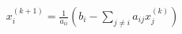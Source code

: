 \documentclass[preview]{standalone}
\begin{document}
\begin{align*}
x_i^{(k+1)} = \frac{1}{a_{ii}} \left( b_i - \sum_{j \neq i} a_{ij} x_j^{(k)} \right)
\end{align*}
\end{document}
